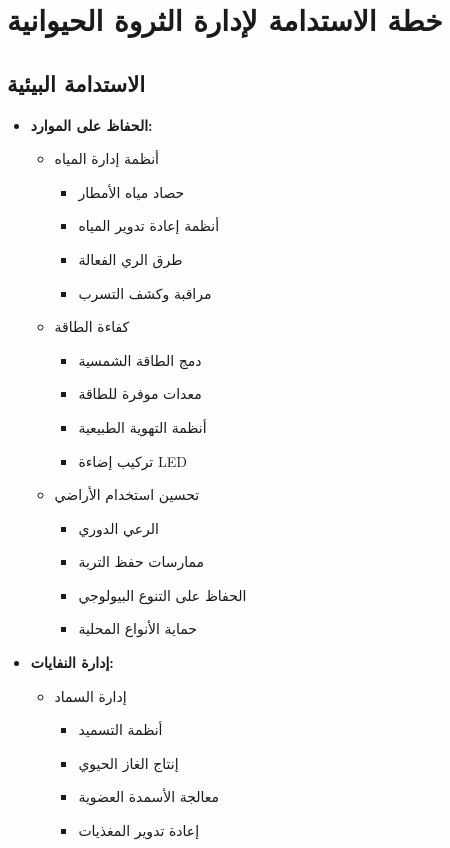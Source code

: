 \section{خطة الاستدامة لإدارة الثروة الحيوانية}

\subsection{الاستدامة البيئية}
\begin{itemize}
    \item \textbf{الحفاظ على الموارد:}
    \begin{itemize}
        \item أنظمة إدارة المياه
        \begin{itemize}
            \item حصاد مياه الأمطار
            \item أنظمة إعادة تدوير المياه
            \item طرق الري الفعالة
            \item مراقبة وكشف التسرب
        \end{itemize}
        
        \item كفاءة الطاقة
        \begin{itemize}
            \item دمج الطاقة الشمسية
            \item معدات موفرة للطاقة
            \item أنظمة التهوية الطبيعية
            \item تركيب إضاءة LED
        \end{itemize}
        
        \item تحسين استخدام الأراضي
        \begin{itemize}
            \item الرعي الدوري
            \item ممارسات حفظ التربة
            \item الحفاظ على التنوع البيولوجي
            \item حماية الأنواع المحلية
        \end{itemize}
    \end{itemize}
    
    \item \textbf{إدارة النفايات:}
    \begin{itemize}
        \item إدارة السماد
        \begin{itemize}
            \item أنظمة التسميد
            \item إنتاج الغاز الحيوي
            \item معالجة الأسمدة العضوية
            \item إعادة تدوير المغذيات
        \end{itemize}
        

\end{itemize}
\end{itemize}
